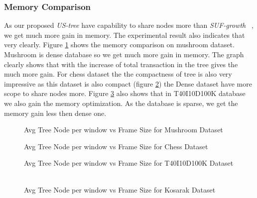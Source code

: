 \clearpage
	\subsubsection{Memory Comparison}
		As our proposed \emph{US-tree} have capability to share nodes more than \emph{SUF-growth} ~\cite{dataset}, we get much more gain in memory. The experimental result also indicates that very clearly. Figure \ref{result:g_m_memory_node} shows the memory comparison on mushroom dataset. Mushroom is dense database so we get  much more gain in memory. The graph clearly shows that with the increase of total transaction in the tree gives the much more gain. For chess dataset the the compactness of tree is also very impressive as this dataset is also compact (figure \ref{result:g_chess_memory_node}) the Dense dataset have more scope to share nodes more. Figure \ref{result:g_t10_memory_node} also shows that in T40I10D100K database we also gain the memory optimization. As the database is sparse, we get the memory gain less then dense one.
			\begin{figure}[h]
			\centering
				
			\caption{Avg Tree Node per window vs Frame Size for Mushroom Dataset ~\cite{dataset}}
			\label{result:g_m_memory_node}
			\end{figure}
			
			\begin{figure}[h]
			\centering
				
			\caption{Avg Tree Node per window vs Frame Size for Chess Dataset ~\cite{dataset}}
			\label{result:g_chess_memory_node}
			\end{figure}
			
			\begin{figure}[h]
				
			\caption{Avg Tree Node per window vs Frame Size for T40I10D100K Dataset ~\cite{dataset}}
			\label{result:g_t10_memory_node}
			\end{figure}
		
			\begin{figure}[h]
			\centering
				
			\caption{Avg Tree Node per window vs Frame Size for Kosarak Dataset ~\cite{dataset}}
			\label{result:g_k_memory_node}
			\end{figure}